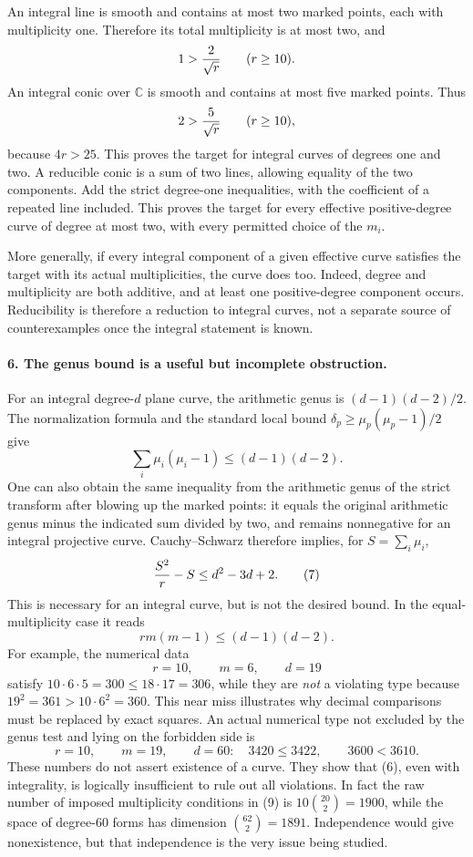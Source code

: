 \documentclass[11pt]{article}
\begin{document}
An integral line is smooth and contains at most two marked points, each with multiplicity one. Therefore its total multiplicity is at most two, and
\[
 1>{2\over\sqrt r}\qquad(r\ge10).
\]
An integral conic over $\mathbb C$ is smooth and contains at most five marked points. Thus
\[
 2>{5\over\sqrt r}\qquad(r\ge10),
\]
because $4r>25$. This proves the target for integral curves of degrees one and two. A reducible conic is a sum of two lines, allowing equality of the two components. Add the strict degree-one inequalities, with the coefficient of a repeated line included. This proves the target for every effective positive-degree curve of degree at most two, with every permitted choice of the $m_i$.

More generally, if every integral component of a given effective curve satisfies the target with its actual multiplicities, the curve does too. Indeed, degree and multiplicity are both additive, and at least one positive-degree component occurs. Reducibility is therefore a reduction to integral curves, not a separate source of counterexamples once the integral statement is known.

\paragraph{6. The genus bound is a useful but incomplete obstruction.}
For an integral degree-$d$ plane curve, the arithmetic genus is $(d-1)(d-2)/2$. The normalization formula and the standard local bound $\delta_p\ge\mu_p(\mu_p-1)/2$ give
\[
 \sum_i\mu_i(\mu_i-1)\le(d-1)(d-2).                    \tag{6}
\]
One can also obtain the same inequality from the arithmetic genus of the strict transform after blowing up the marked points: it equals the original arithmetic genus minus the indicated sum divided by two, and remains nonnegative for an integral projective curve. Cauchy--Schwarz therefore implies, for $S=\sum_i\mu_i$,
\[
 {S^2\over r}-S\le d^2-3d+2.                           \tag{7}
\]
This is necessary for an integral curve, but is not the desired bound. In the equal-multiplicity case it reads
\[
 r m(m-1)\le(d-1)(d-2).                                \tag{8}
\]
For example, the numerical data
\[
 r=10,\qquad m=6,\qquad d=19
\]
satisfy $10\cdot6\cdot5=300\le18\cdot17=306$, while they are \emph{not} a violating type because $19^2=361>10\cdot6^2=360$. This near miss illustrates why decimal comparisons must be replaced by exact squares. An actual numerical type not excluded by the genus test and lying on the forbidden side is
\[
 r=10,\qquad m=19,\qquad d=60:
 \quad 3420\le3422,\qquad 3600<3610.                    \tag{9}
\]
These numbers do not assert existence of a curve. They show that (6), even with integrality, is logically insufficient to rule out all violations. In fact the raw number of imposed multiplicity conditions in (9) is $10\binom{20}{2}=1900$, while the space of degree-60 forms has dimension $\binom{62}{2}=1891$. Independence would give nonexistence, but that independence is the very issue being studied.
\end{document}
